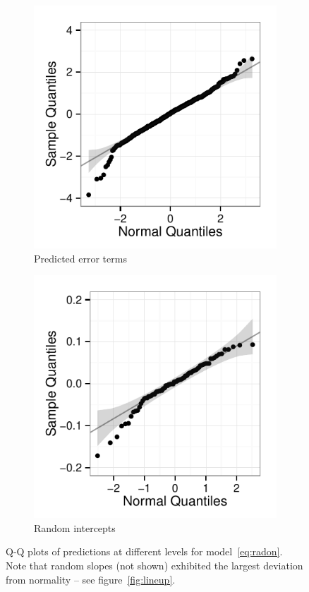 \documentclass{article} %
\begin{document}
\begin{figure}[htb]
	\centering
	  \begin{subfigure}[b]{0.4\linewidth}
		\includegraphics[width=\linewidth]{raw-lev1-qq.pdf}
		\caption{Predicted error terms}
	  \end{subfigure}	
	  \begin{subfigure}[b]{0.4\linewidth}
	\includegraphics[width=\linewidth]{raw-intercept-qq.pdf}
		\caption{Random intercepts}
	  \end{subfigure}	
	\caption{\label{fig:qqplots1} Q-Q plots of predictions at different levels %
	for model~\eqref{eq:radon}. Note that random slopes (not shown) exhibited the largest deviation from normality -- see figure~\ref{fig:lineup}. }
\end{figure}
\end{document}
